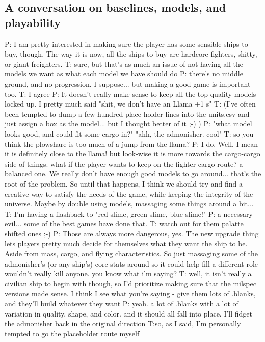 \subsection{A conversation on baselines, models, and playability}

P: I am pretty interested in making sure the player has some sensible ships to buy, though.
The way it is now, all the ships to buy are hardcore fighters, shitty, or giant freighters.
T: sure, but that's as much an issue of not having all the models we want as what each model we have should do
P: there's no middle ground, and no progression.
I suppose...
but making a good game is important too.
T: I agree
P: It doesn't really make sense to keep all the top quality models locked up.
I pretty much said "shit, we don't have an Llama +1 s"
T: (I've often been tempted to dump a few hundred place-holder lines into the units.csv and just assign a box as the model... but I thought better of it ;-) )
P: "what model looks good, and could fit some cargo in?"
"ahh, the admonisher. cool"
T: so you think the plowshare is too much of a jump from the llama?
P: I do. Well, I mean it is definitely close to the llama! but look-wise it is more towards the cargo-cargo side of things.
what if the player wants to keep on the fighter-cargo route?
a balanced one.
We really don't have enough good models to go around... that's the root of the problem.
So until that happens, I think we should try and find a creative way to satisfy the needs of the game, while keeping the integrity of the universe.
Maybe by double using models, massaging some things around a bit...
T: I'm having a flashback to "red slime, green slime, blue slime!"
P: a necessary evil...
some of the best games have done that.
T: watch out for them palatte shifted ones ;-)
P: Those are always more dangerous, yes.
The new upgrade thing lets players pretty much decide for themselves what they want the ship to be. Aside from mass, cargo, and flying characteristics.
So just massaging some of the admonisher's (or any ship's) core stats around so it could help fill a different role wouldn't really kill anyone.
you know what i'm saying?
T: well, it isn't really a civilian ship to begin with though, so I'd prioritize making sure that the milspec versions made sense.
I think I see what you're saying - give them lots of .blanks, and they'll build whatever they want
P: yeah. a lot of .blanks with a lot of variation in quality, shape, and color. and it should all fall into place.
I'll fidget the admonisher back in the original direction
T:so, as I said, I'm personally tempted to go the placeholder route myself
